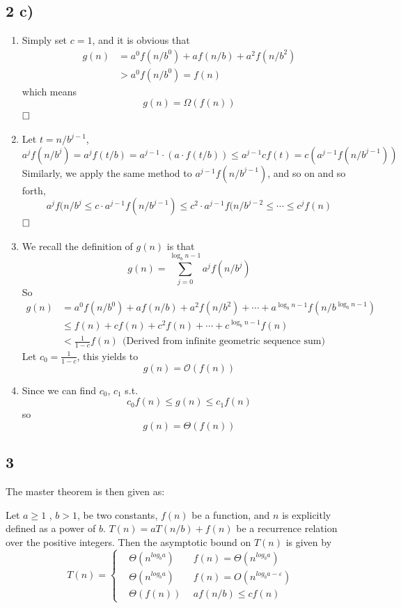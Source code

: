 \documentclass[A4paper]{article}
\newcommand{\qedhere}{$\hfill\ensuremath{\square}$}
\begin{document}
\subsection*{2 c)}
\begin{enumerate}
\item Simply set $c = 1$, and it is obvious that 
\[
	\begin{aligned}
	g(n) &= a^0 f(n/b^0) + af(n/b) + a^2 f(n/b^2) \\
		& > a^0 f(n/b^0) = f(n)
	\end{aligned}
\]
which means 
\[
	g(n) = \Omega (f(n))
\]
\qedhere
\item Let $t = n/b^{j-1}$,
\[
	a^j f(n/b^j)= a^j f(t/b) = a^{j-1} \cdot (a\cdot f(t/b)) \leq  a^{j-1} c f(t) = c(a^{j-1}  f(n/b^{j-1}))
\]
Similarly, we apply the same method to $a^{j-1}f(n/b^{j-1})$, and so on and so forth,
\[
	a^jf(n/b^j\leq c\cdot a^{j-1} f(n/b^{j-1}) \leq c^2 \cdot  a^{j-1} f(n/b^{j-2} \leq \cdots \leq c^j f(n)
\]
\qedhere
\item We recall the definition of $g(n)$ is that 
\[
 	g(n) = \sum_{j=0} ^{\log_b n-1} a^j f(n/b^j) 	
\]
So 
\[
	\begin{aligned}
	g(n) &= a^0 f(n/b^0) + af(n/b) + a^2 f(n/b^2) + \cdots + a^{\log_bn-1}f(n/b^{\log_bn-1})
	\\ & \leq f(n) + c f(n) + c^2 f(n) + \cdots + c^{\log_b n-1} f(n)
	\\ & < \frac{1}{1-c} f(n) \ \ \text{(Derived from infinite geometric sequence sum)}
	\end{aligned}
\]
Let $c_0= \frac{1}{1-c}$, this yields to \[
	g(n)= \mathcal{O} (f(n))
\]
\item Since we can find $c_0$, $c_1$ s.t. 
\[
	c_0 f(n) \leq g(n) \leq c_1 f(n)
\]
so \[
	g(n) = \Theta(f(n))
\]
\end{enumerate}
\subsection*{3}
The master theorem is then given as:
\par Let $ a \geq 1$ , $b > 1$, be two constants, $f(n)$ be a function, and $n$ is explicitly defined as a power of $b$. $T(n) = aT(n/b) +f(n)$ be a recurrence relation over the positive integers. Then the asymptotic bound on $T(n)$ is given by
\[
	T(n) = \left\{
	\begin{aligned}
	&\Theta(n^{log_ba}) \ \ & f(n) = \Theta(n^{log_ba})\\
	& \Theta(n^{log_ba})\ \ \  & f(n) = O(n^{log_ba- \varepsilon}) \\
	& \Theta(f(n))\ \  & af(n/b) \leq cf(n)
	\end{aligned}
	\right.
\]
\end{document}
